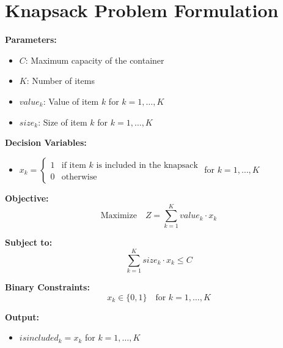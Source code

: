 \documentclass{article}
\begin{document}
\section*{Knapsack Problem Formulation}

\noindent \textbf{Parameters:}
\begin{itemize}
    \item $C$: Maximum capacity of the container
    \item $K$: Number of items
    \item $value_k$: Value of item $k$ for $k = 1, \ldots, K$
    \item $size_k$: Size of item $k$ for $k = 1, \ldots, K$
\end{itemize}

\noindent \textbf{Decision Variables:}
\begin{itemize}
    \item $x_k = 
    \begin{cases} 
    1 & \text{if item $k$ is included in the knapsack} \\
    0 & \text{otherwise}
    \end{cases}$ for $k = 1, \ldots, K$
\end{itemize}

\noindent \textbf{Objective:}
\begin{equation}
\text{Maximize} \quad Z = \sum_{k=1}^{K} value_k \cdot x_k
\end{equation}

\noindent \textbf{Subject to:}
\begin{equation}
\sum_{k=1}^{K} size_k \cdot x_k \leq C
\end{equation}

\noindent \textbf{Binary Constraints:}
\begin{equation}
x_k \in \{0, 1\} \quad \text{for } k = 1, \ldots, K
\end{equation}

\noindent \textbf{Output:}
\begin{itemize}
    \item $isincluded_k = x_k$ for $k = 1, \ldots, K$
\end{itemize}
\end{document}

